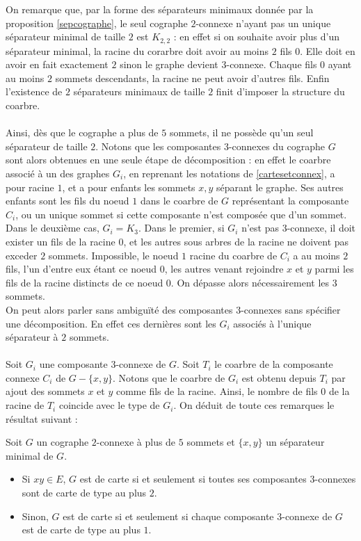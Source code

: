 \documentclass{scrartcl}
\begin{document}
\begin{flushleft}
On remarque que, par la forme des séparateurs minimaux donnée par la proposition \ref{sepcographe}, le seul cographe $2$-connexe n'ayant
pas un unique séparateur minimal de taille $2$ est $K_{2,2}$ : en effet si on souhaite avoir plus d'un séparateur minimal,
la racine du corarbre doit avoir au moins $2$ fils $0$. Elle doit en avoir en fait exactement $2$ sinon le graphe devient $3$-connexe.
Chaque fils $0$ ayant au moins $2$ sommets descendants, la racine ne peut avoir d'autres fils. Enfin l'existence de $2$ séparateurs minimaux
de taille $2$ finit d'imposer la structure du coarbre.
\\~\\
Ainsi, dès que le cographe a plus de $5$ sommets, il ne possède qu'un seul séparateur de taille $2$. Notons que les composantes $3$-connexes
du cographe $G$ sont alors obtenues en une seule étape de décomposition : en effet le coarbre associé à un des graphes $G_i$, en reprenant
les notations de \ref{cartesetconnex}, a pour racine $1$, et a pour enfants les sommets $x,y$ séparant le graphe.
Ses autres enfants sont les fils du noeud $1$ dans le coarbre de $G$ représentant la composante $C_i$, ou un unique sommet si
cette composante n'est composée que d'un sommet. Dans le deuxième cas, $G_i = K_3$. Dans le premier, si $G_i$ n'est pas $3$-connexe,
il doit exister un fils de la racine $0$, et les autres sous arbres de la racine ne doivent pas exceder $2$ sommets. Impossible,
le noeud $1$ racine du coarbre de $C_i$ a au moins $2$ fils, l'un d'entre eux étant ce noeud $0$, les autres venant rejoindre $x$ et $y$
parmi les fils de la racine distincts de ce noeud $0$. On dépasse alors nécessairement les $3$ sommets.\\
On peut alors parler sans ambiguïté des composantes $3$-connexes sans spécifier une décomposition. En effet ces dernières sont
les $G_i$ associés à l'unique séparateur à $2$ sommets.
\\~\\
Soit $G_i$ une composante $3$-connexe de $G$. Soit $T_i$ le coarbre de la composante connexe $C_i$ de $G - \{x,y\}$.
Notons que le coarbre de $G_i$ est obtenu depuis $T_i$ par ajout des sommets $x$ et $y$ comme fils de la racine. Ainsi, le nombre de fils
$0$ de la racine de $T_i$ coincide avec le type de $G_i$. On déduit de toute ces remarques le résultat suivant :

\begin{theorem}\label{cographe2conn}
    Soit $G$ un cographe $2$-connexe à plus de $5$ sommets et $\{x,y\}$ un séparateur minimal de $G$. 
    \begin{itemize}
        \item Si $xy \in E$, $G$ est de carte si et seulement si toutes ses composantes $3$-connexes sont de carte de type au plus $2$.
        \item Sinon, $G$ est de carte si et seulement si chaque composante $3$-connexe de $G$ est de carte de type au plus $1$.
    \end{itemize}
\end{theorem}


\end{flushleft}
\end{document}
